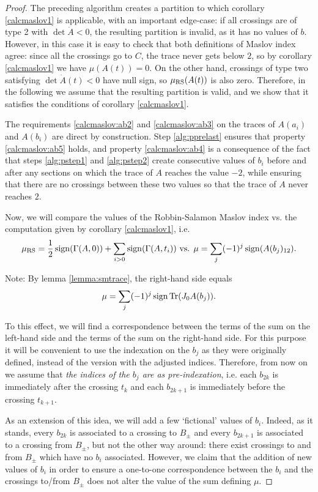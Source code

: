 \begin{proof}
The preceding algorithm creates a partition to which corollary \ref{calcmaslov1} is applicable, with an important edge-case: if all crossings are of type 2 with $\det \dot A < 0$, the resulting partition is invalid, as it has no values of $b$. However, in this case it is easy to check that both definitions of Maslov index agree: since all the crossings go to $C$, the trace never gets below $2$, so by corollary \ref{calcmaslov1} we have $\mu(A(t)) = 0$. On the other hand, crossings of type two satisfying $\det \dot A(t) < 0$ have null sign, so $\mu_{\mathrm{RS}}(A(t))$ is also zero. Therefore, in the following we assume that the resulting partition is valid, and we show that it satisfies the conditions of corollary \ref{calcmaslov1}.

The requirements \ref{calcmaslov:ab2} and \ref{calcmaslov:ab3} on the traces of $A(a_i)$ and $A(b_i)$ are direct by construction. Step \ref{alg:pprelast} ensures that property \ref{calcmaslov:ab5} holds, and property \ref{calcmaslov:ab4} is a consequence of the fact that steps \ref{alg:pstep1} and \ref{alg:pstep2} create consecutive values of $b_i$ before and after any sections on which the trace of $A$ reaches the value $-2$, while ensuring that there are no crossings between these two values so that the trace of $A$ never reaches $2$.

Now, we will compare the values of the Robbin-Salamon Maslov index vs. the computation given by corollary \ref{calcmaslov1}, i.e.
\begin{equation}
\mu_{\mathrm{RS}} = \frac12 \operatorname{sign}(\Gamma(A,0)) + \sum_{i>0} \operatorname{sign}(\Gamma(A,t_i)) \text{ vs. } \mu = \sum_j (-1)^j \operatorname{sign}(A(b_j)_{12}).
\end{equation}

Note: By lemma \ref{lemma:smtrace}, the right-hand side equals
\begin{equation}
\mu = \sum_j (-1)^j \operatorname{sign} \operatorname{Tr}(J_0 A(b_j)).
\end{equation}

To this effect, we will find a correspondence between the terms of the sum on the left-hand side and the terms of the sum on the right-hand side. For this purpose it will be convenient to use the indexation on the $b_j$ as they were originally defined, instead of the version with the adjusted indices. Therefore, from now on we assume that \emph{the indices of the $b_j$ are as pre-indexation}, i.e. each $b_{2k}$ is immediately after the crossing $t_k$ and each $b_{2k+1}$ is immediately before the crossing $t_{k+1}$.

As an extension of this idea, we will add a few `fictional' values of $b_i$. Indeed, as it stands, every $b_{2k}$ is associated to a crossing to $B_\pm$ and every $b_{2k+1}$ is associated to a crossing from $B_\pm$, but not the other way around: there exist crossings to and from $B_\pm$ which have no $b_i$ associated. However, we claim that the addition of new values of $b_i$ in order to ensure a one-to-one correspondence between the $b_i$ and the crossings to/from $B_\pm$ does not alter the value of the sum defining $\mu$.


\end{proof}
